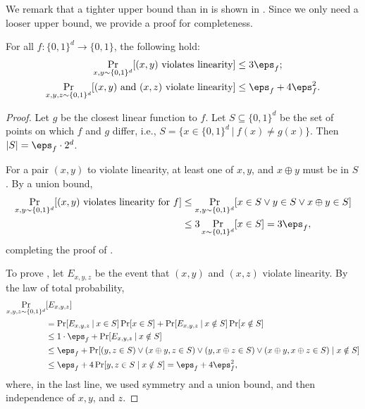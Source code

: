 \documentclass{toc}
\begin{document}
 We remark that a tighter upper bound than  in  is shown in \cite[Lemma 3.2]{BellareCHKS96}. Since we only need a looser upper bound, we provide a proof for completeness. 

\begin{claim}\label{clm:witness_upper}
For all $f\colon \{0,1\}^d \to \{0,1\}$, the following hold:
\begin{align}
    \Pr_{x,y\sim \{0,1\}^d}[(x,y) \textnormal{ violates linearity}] &\leq 3\eps_f; \label{eq:witness_upper}\\
        \Pr_{x,y,z\sim \{0,1\}^d}[(x,y) \textnormal{ and } (x, z) \textnormal{ violate linearity}] &\leq \eps_f + 4\eps_f^2.\label{eq:double_witness_upper} 
\end{align}
\end{claim}
\begin{proof}
Let $g$ be the closest linear function to $f$. Let $S \subseteq \{0,1\}^d$ be the set of points on which $f$ and $g$ differ, i.e., $S = \{x \in \{0,1\}^d \: | \: f(x)\neq g(x)\}$. Then $|S| = \eps_f \cdot 2^d$.

For a pair $(x, y)$ to violate linearity, at least one of $x, y$, and  $x\oplus y$ must be in $S$. By a union bound,
\begin{align*}
  \Pr_{x,y \sim\{0,1\}^d}[(x,y)
  \textnormal{ violates linearity for $f$}] 
 &\leq \Pr_{x,y\sim \{0,1\}^d}[x \in S \vee y \in S \vee x\oplus y \in S]\\ 
     &\leq 3\Pr_{x\sim\{0,1\}^d}[x \in S] = 3\eps_f,
\end{align*}
completing the proof of . 

To prove , let $E_{x,y,z}$ be the event that $(x,y)$ and $(x,z)$ violate linearity. By the law of total probability,
\begin{align*}   %
      \Pr_{x,y,z\sim \{0,1\}^d}&[E_{x,y,z}] \\
      &=      \Pr[E_{x,y,z} \: | \: x\in S]\Pr[x \in S]+ \Pr[E_{x,y,z} \: | \: x\notin S]\Pr[x \notin S] \nonumber \\
      &\leq 1\cdot \eps_f  + \Pr[E_{x,y,z} \: | \: x\notin S] \\ 
      &\leq \eps_f + \Pr[(y,z \in S) \vee (x \oplus y, z \in S) \vee (y, x \oplus z \in S) \vee (x \oplus y, x \oplus z \in S)\mid x \notin S]\\
      &\leq \eps_f + 4\Pr[y,z \in S\mid x \notin S] 
      = \eps_f + 4\eps_f^2,
\end{align*}
where, in the last line, we used symmetry and a union bound, and then independence of $x, y$, and $z$. 
\end{proof}
\end{document}
